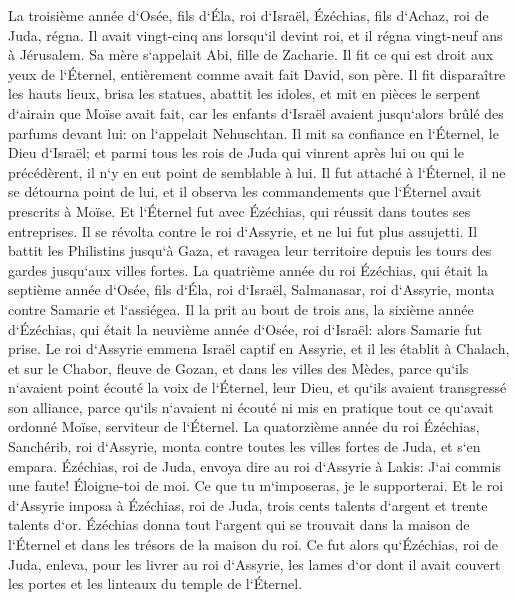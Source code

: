 \verse La troisième année d`Osée, fils d`Éla, roi d`Israël, Ézéchias, fils d`Achaz, roi de Juda, régna. 
\verse Il avait vingt-cinq ans lorsqu`il devint roi, et il régna vingt-neuf ans à Jérusalem. Sa mère s`appelait Abi, fille de Zacharie. 
\verse Il fit ce qui est droit aux yeux de l`Éternel, entièrement comme avait fait David, son père. 
\verse Il fit disparaître les hauts lieux, brisa les statues, abattit les idoles, et mit en pièces le serpent d`airain que Moïse avait fait, car les enfants d`Israël avaient jusqu`alors brûlé des parfums devant lui: on l`appelait Nehuschtan. 
\verse Il mit sa confiance en l`Éternel, le Dieu d`Israël; et parmi tous les rois de Juda qui vinrent après lui ou qui le précédèrent, il n`y en eut point de semblable à lui. 
\verse Il fut attaché à l`Éternel, il ne se détourna point de lui, et il observa les commandements que l`Éternel avait prescrits à Moïse. 
\verse Et l`Éternel fut avec Ézéchias, qui réussit dans toutes ses entreprises. Il se révolta contre le roi d`Assyrie, et ne lui fut plus assujetti. 
\verse Il battit les Philistins jusqu`à Gaza, et ravagea leur territoire depuis les tours des gardes jusqu`aux villes fortes. 
\verse La quatrième année du roi Ézéchias, qui était la septième année d`Osée, fils d`Éla, roi d`Israël, Salmanasar, roi d`Assyrie, monta contre Samarie et l`assiégea. 
\verse Il la prit au bout de trois ans, la sixième année d`Ézéchias, qui était la neuvième année d`Osée, roi d`Israël: alors Samarie fut prise. 
\verse Le roi d`Assyrie emmena Israël captif en Assyrie, et il les établit à Chalach, et sur le Chabor, fleuve de Gozan, et dans les villes des Mèdes, 
\verse parce qu`ils n`avaient point écouté la voix de l`Éternel, leur Dieu, et qu`ils avaient transgressé son alliance, parce qu`ils n`avaient ni écouté ni mis en pratique tout ce qu`avait ordonné Moïse, serviteur de l`Éternel. 
\verse La quatorzième année du roi Ézéchias, Sanchérib, roi d`Assyrie, monta contre toutes les villes fortes de Juda, et s`en empara. 
\verse Ézéchias, roi de Juda, envoya dire au roi d`Assyrie à Lakis: J`ai commis une faute! Éloigne-toi de moi. Ce que tu m`imposeras, je le supporterai. Et le roi d`Assyrie imposa à Ézéchias, roi de Juda, trois cents talents d`argent et trente talents d`or. 
\verse Ézéchias donna tout l`argent qui se trouvait dans la maison de l`Éternel et dans les trésors de la maison du roi. 
\verse Ce fut alors qu`Ézéchias, roi de Juda, enleva, pour les livrer au roi d`Assyrie, les lames d`or dont il avait couvert les portes et les linteaux du temple de l`Éternel. 
